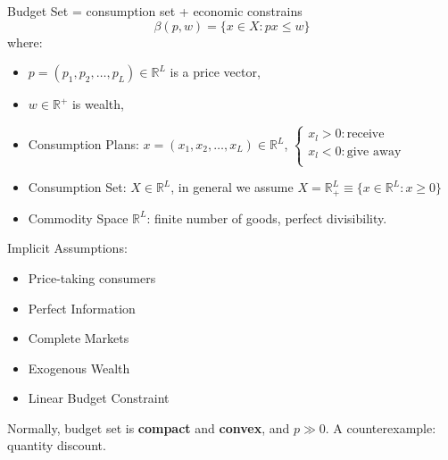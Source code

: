 
\begin{definition}
    Budget Set = consumption set + economic constrains \[
        \beta(p,w) = \{x \in X: px \leq w\}
    \] where:
    \begin{itemize}
        \item $p = (p_1, p_2,\dots,p_L) \in \mathbb{R}^{L}$ is a price vector,
        \item $w \in \mathbb{R}^{+}$ is wealth,
        \item Consumption Plans: $x = (x_1, x_2, \dots, x_L) \in \mathbb{R}^{L}$,  $\left\{\begin{array}{l}
                      x_l > 0: \text{receive}   \\
                      x_l < 0: \text{give away} \\
                  \end{array}\right.$
        \item Consumption Set: $X \in \mathbb{R}^{L}$, in general we assume $X = \mathbb{R}^{L}_{+}\equiv\{x\in \mathbb{R}^{L}: x \geq 0\}$
        \item  Commodity Space $\mathbb{R}^{L}$: finite number of goods, perfect divisibility.
    \end{itemize}

\end{definition}
\begin{remark*}
    Implicit Assumptions: \begin{itemize}
        \item Price-taking consumers
        \item Perfect Information
        \item Complete Markets
        \item Exogenous Wealth
        \item Linear Budget Constraint
    \end{itemize}

    Normally, budget set is \textbf{compact} and \textbf{convex}, and $p \gg 0$.
    A counterexample: quantity discount.
\end{remark*}

